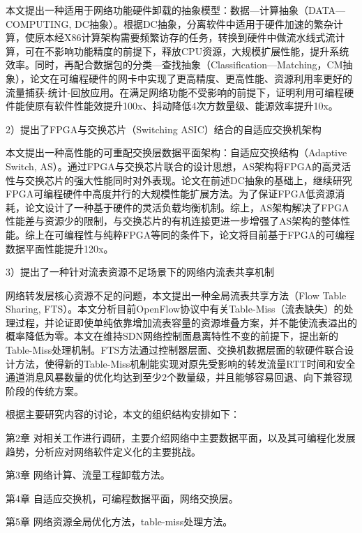 本文提出一种适用于网络功能硬件卸载的抽象模型：数据—计算抽象（DATA—COMPUTING, DC抽象）。根据DC抽象，分离软件中适用于硬件加速的繁杂计算，使原本经X86计算架构需要频繁访存的任务，转换到硬件中做流水线式流计算，可在不影响功能精度的前提下，释放CPU资源，大规模扩展性能，提升系统效率。同时，再配合数据包的分类—查找抽象（Classification—Matching，CM抽象），论文在可编程硬件的网卡中实现了更高精度、更高性能、资源利用率更好的流量捕获-统计-回放应用。在满足网络功能不受影响的前提下，证明利用可编程硬件能使原有软件性能效提升100x、抖动降低4次方数量级、能源效率提升10x。

2）提出了FPGA与交换芯片（Switching ASIC）结合的自适应交换机架构

本文提出一种高性能的可重配交换层数据平面架构：自适应交换结构（Adaptive Switch, AS）。通过FPGA与交换芯片联合的设计思想，AS架构将FPGA的高灵活性与交换芯片的强大性能同时对外表现。论文在前述DC抽象的基础上，继续研究FPGA可编程硬件中高度并行的大规模性能扩展方法。为了保证FPGA低资源消耗，论文设计了一种基于硬件的灵活负载均衡机制。综上，AS架构解决了FPGA性能差与资源少的限制，与交换芯片的有机连接更进一步增强了AS架构的整体性能。综上在可编程性与纯粹FPGA等同的条件下，论文将目前基于FPGA的可编程数据平面性能提升120x。


3）提出了一种针对流表资源不足场景下的网络内流表共享机制

网络转发层核心资源不足的问题，本文提出一种全局流表共享方法（Flow Table Sharing, FTS）。本文分析目前OpenFlow协议中有关Table-Miss（流表缺失）的处理过程，并论证即使单纯依靠增加流表容量的资源堆叠方案，并不能使流表溢出的概率降低为零。本文在维持SDN网络控制面悬离特性不变的前提下，提出新的Table-Miss处理机制。FTS方法通过控制器层面、交换机数据层面的软硬件联合设计方法，使得新的Table-Miss机制能实现对原先受影响的转发流量RTT时间和安全通道消息风暴数量的优化均达到至少2个数量级，并且能够容易回退、向下兼容现阶段的传统方案。



根据主要研究内容的讨论，本文的组织结构安排如下：

第2章 对相关工作进行调研，主要介绍网络中主要数据平面，以及其可编程化发展趋势，分析应对网络软件定义化的主要挑战。

第3章 网络计算、流量工程卸载方法。

第4章 自适应交换机，可编程数据平面，网络交换层。

第5章 网络资源全局优化方法，table-miss处理方法。

